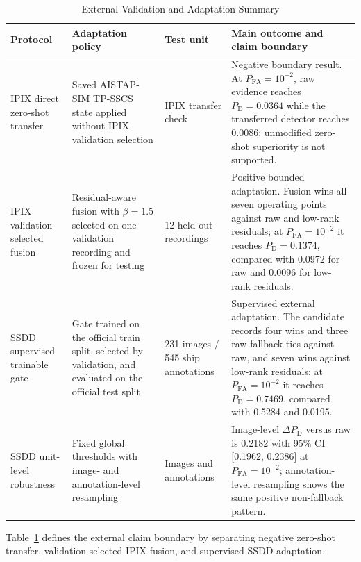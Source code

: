 \documentclass[journal]{IEEEtran}
\begin{document}
\begin{table}[!t]
\caption{External Validation and Adaptation Summary}
\label{tab:external-validation-summary}
\centering
\footnotesize
\renewcommand{\arraystretch}{1.15}
\begin{tabular}{@{}p{}p{}p{}p{}@{}}
\toprule
Protocol & Adaptation policy & Test unit & Main outcome and claim boundary \\
\midrule
IPIX direct zero-shot transfer & Saved AISTAP-SIM TP-SSCS state applied without IPIX validation selection & IPIX transfer check & Negative boundary result. At $P_{\mathrm{FA}}=10^{-2}$, raw evidence reaches $P_{\mathrm{D}}=0.0364$ while the transferred detector reaches 0.0086; unmodified zero-shot superiority is not supported. \\
IPIX validation-selected fusion & Residual-aware fusion with $\beta=1.5$ selected on one validation recording and frozen for testing & 12 held-out recordings & Positive bounded adaptation. Fusion wins all seven operating points against raw and low-rank residuals; at $P_{\mathrm{FA}}=10^{-2}$ it reaches $P_{\mathrm{D}}=0.1374$, compared with 0.0972 for raw and 0.0096 for low-rank residuals. \\
SSDD supervised trainable gate & Gate trained on the official train split, selected by validation, and evaluated on the official test split & 231 images / 545 ship annotations & Supervised external adaptation. The candidate records four wins and three raw-fallback ties against raw, and seven wins against low-rank residuals; at $P_{\mathrm{FA}}=10^{-2}$ it reaches $P_{\mathrm{D}}=0.7469$, compared with 0.5284 and 0.0195. \\
SSDD unit-level robustness & Fixed global thresholds with image- and annotation-level resampling & Images and annotations & Image-level $\Delta P_{\mathrm{D}}$ versus raw is 0.2182 with 95\% CI [0.1962, 0.2386] at $P_{\mathrm{FA}}=10^{-2}$; annotation-level resampling shows the same positive non-fallback pattern. \\
\bottomrule
\end{tabular}
\vspace{0.35em}
\parbox{0.94\textwidth}{\scriptsize Table~\ref{tab:external-validation-summary} defines the external claim boundary by separating negative zero-shot transfer, validation-selected IPIX fusion, and supervised SSDD adaptation.}
\end{table}
\end{document}

